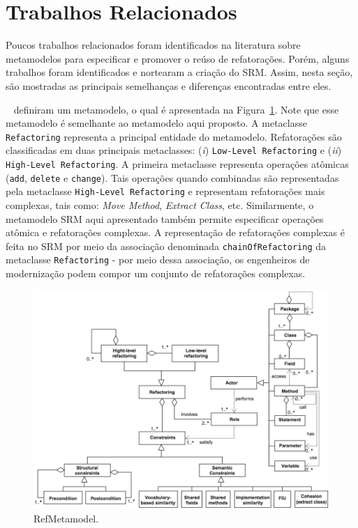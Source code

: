 \section{Trabalhos Relacionados}\label{sec:trabalhos_relacionais_SRM}

Poucos trabalhos relacionados foram identificados na literatura sobre metamodelos para especificar e promover o reúso de refatorações. Porém, alguns trabalhos foram identificados e nortearam a criação do SRM. Assim, nesta seção, são mostradas as principais semelhanças e diferenças encontradas entre eles. 

~ definiram um metamodelo, o qual é apresentada na Figura~\ref{fig:refactoring_metamodel_related}. Note que esse metamodelo é semelhante ao metamodelo aqui proposto. A metaclasse \texttt{Refactoring} representa a principal entidade do metamodelo. Refatorações são classificadas em duas principais metaclasses: (\textit{i}) \texttt{Low-Level Refactoring} e (\textit{ii}) \texttt{High-Level Refactoring}. A primeira metaclasse representa operações atômicas (\texttt{add}, \texttt{delete} e \texttt{change}). Tais operações quando combinadas são representadas pela metaclasse \texttt{High-Level Refactoring} e representam refatorações mais complexas, tais como: \textit{Move Method}, \textit{Extract Class}, etc. Similarmente, o metamodelo SRM aqui apresentado também permite especificar operações atômica e refatorações complexas. A representação de refatorações complexas é feita no SRM por meio da associação denominada \texttt{chainOfRefactoring} da metaclasse \texttt{Refactoring} - por meio dessa associação, os engenheiros de modernização podem compor um conjunto de refatorações complexas.

\begin{figure}[h]
	\centering
	\caption{RefMetamodel.}
	\label{fig:refactoring_metamodel_related}
	\includegraphics[scale=0.45]{images/metamodelo_refatoracao_related}
\end{figure}

